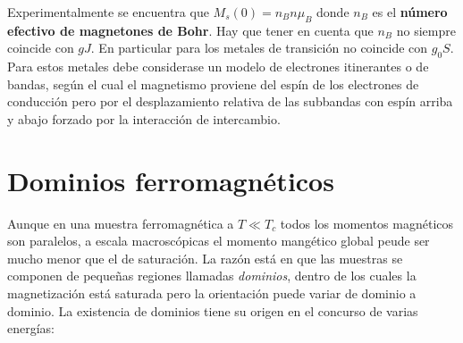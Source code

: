 Experimentalmente se encuentra que $M_s(0) = n_B n \mu_B$ donde $n_B$ es el \textbf{número efectivo de magnetones de Bohr}. Hay que tener en cuenta que $n_B$ no siempre coincide con $gJ$. En particular para los metales de transición no coincide con $g_0S$. Para estos metales debe considerase un modelo de electrones itinerantes o de bandas, según el cual el magnetismo proviene del espín de los electrones de conducción pero por el desplazamiento relativa de las subbandas con espín arriba y abajo forzado por la interacción de intercambio.

\section{Dominios ferromagnéticos}

Aunque en una muestra ferromagnética a $T\ll T_c$ todos los momentos magnéticos son paralelos, a escala macroscópicas el momento mangético global peude ser mucho menor que el de saturación. La razón está en que las muestras se componen de pequeñas regiones llamadas \textit{dominios}, dentro de los cuales la magnetización está saturada pero la orientación puede variar de dominio a dominio. La existencia de dominios tiene su origen en el concurso de varias energías:

